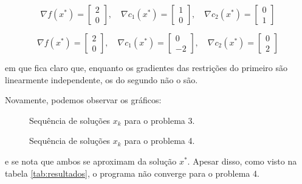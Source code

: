 	\begin{equation*}
		\nabla f(x^*) =
		\begin{bmatrix}
			2 \\
			0
		\end{bmatrix},\quad
		\nabla c_1(x^*) =
		\begin{bmatrix}
			1 \\
			0
		\end{bmatrix},\quad
		\nabla c_2(x^*) =
		\begin{bmatrix}
			0 \\
			1
		\end{bmatrix}
	\end{equation*}

	\begin{equation*}
		\nabla f(x^*) =
		\begin{bmatrix}
			2 \\
			0
		\end{bmatrix},\quad
		\nabla c_1(x^*) =
		\begin{bmatrix}
			0 \\
			-2
		\end{bmatrix},\quad
		\nabla c_2(x^*) =
		\begin{bmatrix}
			0 \\
			2
		\end{bmatrix}
	\end{equation*}

	em que fica claro que, enquanto os gradientes das restrições do primeiro são
	linearmente independente, os do segundo não o são.

	Novamente, podemos observar os gráficos:

	\noindent\begin{figure}[h!]
		\noindent\begin{minipage}[l]{.45\linewidth}
			\scalebox{.7}{}
			\caption{Sequência de soluções $x_k$ para o problema 3.}
		\end{minipage}%
		\hspace{0.1\linewidth}%
		\begin{minipage}[l]{.45\linewidth}
			\scalebox{.7}{}
			\caption{Sequência de soluções $x_k$ para o problema 4.}
		\end{minipage}
	\end{figure}

	e se nota que ambos se aproximam da solução $x^*$. Apesar disso, como visto
	na tabela \ref{tab:resultados}, o programa não converge para o problema 4.

